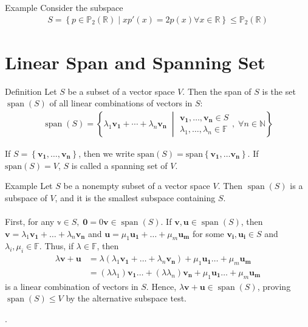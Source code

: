 \documentclass{report}
\renewcommand{\vec}{\mathbf}
\newcommand{\Span}{\operatorname{span}}
\begin{document}
\begin{enumerate}
		\begin{question}{Example}
			Consider the subspace
			\begin{align*}
				S = \left\{p \in \mathbb{P}_2(\mathbb{R}) \;|\; xp'(x) = 2p(x) \forall x \in \mathbb{R}\right\} \leq \mathbb{P}_2(\mathbb{R})
			\end{align*}
		\end{question}
	
	\section{Linear Span and Spanning Set}

		\begin{question}{Definition}
			Let $S$ be a subset of a vector space $V$. Then the span of $S$ is the set $\Span(S)$ of all linear combinations of vectors in $S$:
			\begin{align*}
				\Span(S) = \left\{ \lambda_1\vec{v_1} + \cdots + \lambda_n\vec{v_n} \;\middle| \begin{array}{l}\vec{v_1},\dots,\vec{v_n} \in S \\ \lambda_1,\dots,\lambda_n \in \mathbb{F} \end{array}, \; \forall n \in \mathbb{N}\right\}
			\end{align*}

			If $S = \left\{\vec{v_1},\dots,\vec{v_n}\right\}$, then we write $\text{span}(S) = \text{span}\left\{\vec{v_1},\dots\vec{v_n}\right\}$. If $\text{span}(S) = V$, $S$ is called a spanning set of $V$.
		\end{question}

		\begin{question}{Example}
			Let $S$ be a nonempty subset of a vector space $V$. Then $\Span(S)$ is a subspace of $V$, and it is the smallest subspace containing $S$.
			\\ \\
			First, for any $\mathbb{v} \in S,\; \vec{0} = 0\vec{v} \in \Span(S)$.
			If $\vec{v},\vec{u} \in \Span(S)$, then $\vec{v} = \lambda_1 \vec{v_1} + \dots + \lambda_n \vec{v_n}$ and $\vec{u} = \mu_1 \vec{u_1} + \dots + \mu_m \vec{u_m}$ for some $\vec{v_i}, \vec{u_i} \in S$ and $\lambda_i, \mu_i \in \mathbb{F}$. Thus, if $\lambda \in \mathbb{F}$, then
			\begin{align*}
				\lambda\vec{v} + \vec{u} &= \lambda(\lambda_1\vec{v_1} + \dots + \lambda_n\vec{v_n}) + \mu_1\vec{u_1} \dots + \mu_m\vec{u_m}	\\
										 &= (\lambda \lambda_1) \vec{v_1} \dots + (\lambda \lambda_n) \vec{v_n} + \mu_1\vec{u_1} \dots + \mu_m\vec{u_m}
			\end{align*}
			is a linear combination of vectors in $S$. Hence, $\lambda\vec{v} + \vec{u} \in \Span(S)$, proving $\Span(S) \leq V$ by the alternative subspace test.
		\end{question}.


\end{enumerate}
\end{document}
